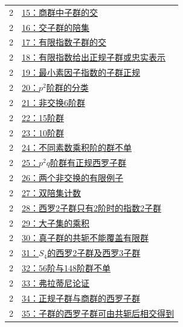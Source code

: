 \documentclass[UTF8,a4paper,11pt,fontset=windows]{ctexart}
\begin{document}
\begin{longtable}{cp{13.5cm}}
2 & \hyperref[ex:2:15]{15：商群中子群的交}\\

2 & \hyperref[ex:2:16]{16：交子群的陪集}\\

2 & \hyperref[ex:2:17]{17：有限指数子群的交}\\

2 & \hyperref[ex:2:18]{18：有限指数给出正规子群或忠实表示}\\

2 & \hyperref[ex:2:19]{19：最小素因子指数的子群正规}\\

2 & \hyperref[ex:2:20]{20：$p^2$阶群的分类}\\

2 & \hyperref[ex:2:21]{21：非交换6阶群}\\

2 & \hyperref[ex:2:22]{22：15阶群}\\

2 & \hyperref[ex:2:23]{23：10阶群}\\

2 & \hyperref[ex:2:24]{24：不同素数乘积阶的群不单}\\

2 & \hyperref[ex:2:25]{25：$p^2q$阶群有正规西罗子群}\\

2 & \hyperref[ex:2:26]{26：两个非交换的有限例子}\\

2 & \hyperref[ex:2:27]{27：双陪集计数}\\

2 & \hyperref[ex:2:28]{28：西罗2子群只有2阶时的指数2子群}\\

2 & \hyperref[ex:2:29]{29：大子集的乘积}\\

2 & \hyperref[ex:2:30]{30：真子群的共轭不能覆盖有限群}\\

2 & \hyperref[ex:2:31]{31：$S_4$的西罗2子群及西罗3子群}\\

2 & \hyperref[ex:2:32]{32：56阶与148阶群不单}\\

2 & \hyperref[ex:2:33]{33：弗拉蒂尼论证}\\

2 & \hyperref[ex:2:34]{34：正规子群与商群的西罗子群}\\

2 & \hyperref[ex:2:35]{35：子群的西罗子群可由共轭后相交得到}\\


\end{longtable}
\end{document}
